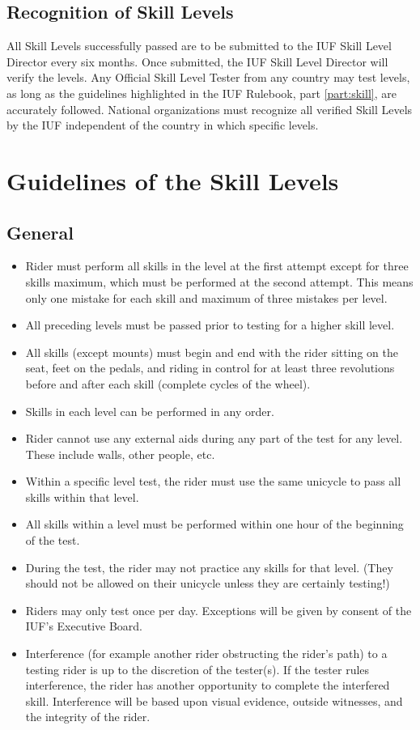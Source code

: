 \subsection{Recognition of Skill Levels}
All Skill Levels successfully passed are to be submitted to the IUF Skill Level Director every six months.
Once submitted, the IUF Skill Level Director will verify the levels.
Any Official Skill Level Tester from any country may test levels, as long as the guidelines highlighted in the IUF Rulebook, part \ref{part:skill}, are accurately followed.
National organizations must recognize all verified Skill Levels by the IUF independent of the country in which specific levels.

\section{Guidelines of the Skill Levels}

\subsection{General}
\begin{itemize}
\item Rider must perform all skills in the level at the first attempt except for three skills maximum, which must be performed at the second attempt.
This means only one mistake for each skill and maximum of three mistakes per
level.
\item All preceding levels must be passed prior to testing for a higher skill level.
\item All skills (except mounts) must begin and end with the rider sitting on the seat, feet on the pedals, and riding in control for at least three revolutions before and after each skill (complete cycles of the wheel).
\item Skills in each level can be performed in any order.
\item Rider cannot use any external aids during any part of the test for any level.
These include walls, other people, etc.
\item Within a specific level test, the rider must use the same unicycle to pass all skills within that level.
\item All skills within a level must be performed within one hour of the beginning of the test.
\item During the test, the rider may not practice any skills for that level.
(They should not be allowed on their unicycle unless they are certainly testing!)
\item Riders may only test once per day.
Exceptions will be given by consent of the IUF's Executive Board.
\item Interference (for example another rider obstructing the rider's path) to a testing rider is up to the discretion of the tester(s).
If the tester rules interference, the rider has another opportunity to complete the interfered skill.
Interference will be based upon visual evidence, outside witnesses, and the integrity of the rider.
\end{itemize}

